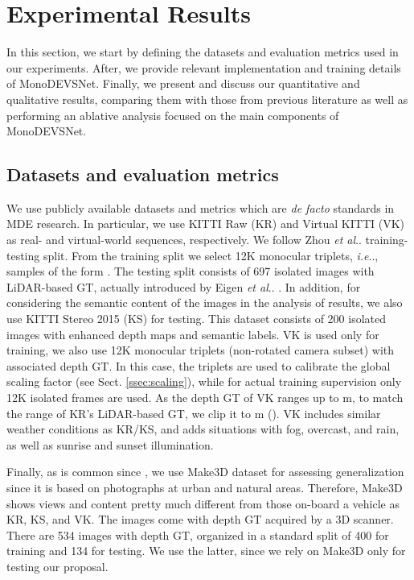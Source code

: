 \documentclass[journal]{IEEEtran}
\makeatletter
\DeclareRobustCommand\onedot{\futurelet\@let@token\@onedot}
\def\@onedot{\ifx\@let@token.\else.\null\fi\xspace}
\def\ie{\emph{i.e}\onedot} \def\Ie{\emph{I.e}\onedot}
\def\etal{\emph{et al}\onedot}
\newcommand{\sSect}[1]{Sect. \ref{ssec:#1}}
\makeatother
\begin{document}
\renewrobustcmd{\boldmath}{}
\newrobustcmd{\B}{\bfseries}
\newrobustcmd{\IL}{\underline}
\addtolength{\tabcolsep}{-4.1pt}


\section{Experimental Results}
\label{sec:experiments}
In this section, we start by defining the datasets and evaluation metrics used in our experiments. After, we provide relevant implementation and training details of MonoDEVSNet. Finally, we present and discuss our quantitative and qualitative results, comparing them with those from previous literature as well as performing an ablative analysis focused on the main components of MonoDEVSNet.

\subsection{Datasets and evaluation metrics}
\label{ssec:datasets}

We use publicly available datasets and metrics which are \emph{de facto} standards in MDE research. In particular, we use KITTI Raw (KR) \cite{Geiger:2013} and Virtual KITTI (VK) \cite{Cabon:2020} as real- and virtual-world sequences, respectively. We follow Zhou {\etal} \cite{Zhou:2017} training-testing split. From the training split we select 12K monocular triplets, {\ie}, samples of the form . The testing split consists of 697 isolated images with LiDAR-based GT, actually introduced by Eigen {\etal} \cite{Eigen:2014}. In addition, for considering the semantic content of the images in the analysis of results, we also use KITTI Stereo 2015 (KS) \cite{Menze:2015} for testing. This dataset consists of 200 isolated images with enhanced depth maps and semantic labels. VK is used only for training, we also use 12K monocular triplets (non-rotated camera subset) with associated depth GT. In this case, the triplets are used to calibrate the global scaling factor  (see \sSect{scaling}), while for actual training supervision only 12K isolated frames are used. As the depth GT of VK ranges up to m, to match the range of KR's LiDAR-based GT, we clip it to m (). VK includes similar weather conditions as KR/KS, and adds situations with fog, overcast, and rain, as well as sunrise and sunset illumination. 

Finally, as is common since \cite{Godard:2017}, we use Make3D dataset \cite{Saxena:2009} for assessing generalization since it is based on photographs at urban and natural areas. Therefore, Make3D shows views and content pretty much different from those on-board a vehicle as KR, KS, and VK. The images come with depth GT acquired by a 3D scanner. There are 534 images with depth GT, organized in a standard split of 400 for training and 134 for testing. We use the latter, since we rely on Make3D only for testing our proposal. 
\end{document}
